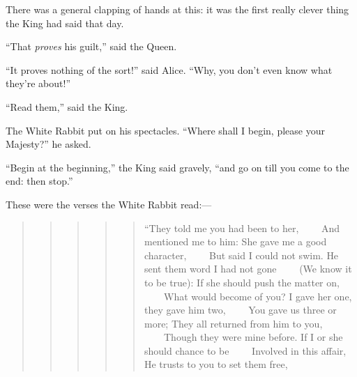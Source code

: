 \documentclass[11pt,openany,oneside]{book}
\begin{document}
There was a general clapping of hands at this: it was the first really clever thing the King had said that day. 

“That {\em proves\/} his guilt,” said the Queen. 

“It proves nothing of the sort!” said Alice. “Why, you don’t even know what they’re about!” 

“Read them,” said the King. 

The White Rabbit put on his spectacles. “Where shall I begin, please your Majesty?” he asked. 

“Begin at the beginning,” the King said gravely, “and go on till you come to the end: then stop.” 

These were the verses the White Rabbit read:— 

\begin{quote}
\begin{quote}
\begin{quote}
\begin{quote}
\begin{quote}
{\small “They told me you had been to her,}\newline
{\small  ~~~~And mentioned me to him:}\newline
{\small  She gave me a good character,}\newline
{\small  ~~~~But said I could not swim.}\newline
{\small  }\newline
{\small  He sent them word I had not gone}\newline
{\small  ~~~~(We know it to be true):}\newline
{\small  If she should push the matter on,}\newline
{\small  ~~~~What would become of you?}\newline
{\small  }\newline
{\small  I gave her one, they gave him two,}\newline
{\small  ~~~~You gave us three or more;}\newline
{\small  They all returned from him to you,}\newline
{\small  ~~~~Though they were mine before.}\newline
{\small  }\newline
{\small  If I or she should chance to be}\newline
{\small  ~~~~Involved in this affair,}\newline
{\small  He trusts to you to set them free,}\newline

\end{quote}
\end{quote}
\end{quote}
\end{quote}
\end{quote}
\end{document}

